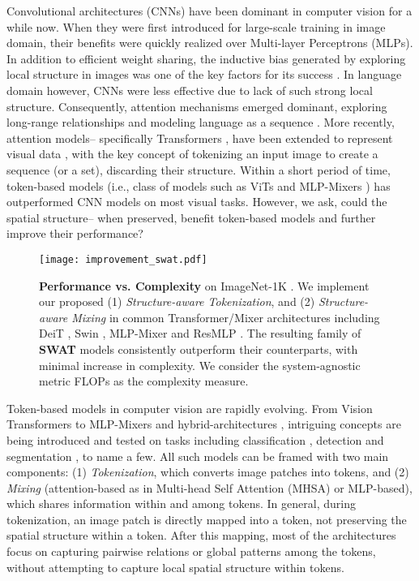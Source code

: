 \documentclass[10pt,twocolumn,letterpaper]{article}
\begin{document}
Convolutional architectures (CNNs) \cite{he2016deep, tan2019efficientnet} have been dominant in computer vision for a while now. When they were first introduced for large-scale training in image domain, their benefits were quickly realized over Multi-layer Perceptrons (MLPs). In addition to efficient weight sharing, the inductive bias generated by exploring local structure in images was one of the key factors for its success \cite{lecun2015deep}. In language domain however, CNNs were less effective due to lack of such strong local structure. Consequently, attention mechanisms emerged dominant, exploring long-range relationships and modeling language as a sequence \cite{dauphin2017language}. 
More recently, attention models-- specifically Transformers \cite{vaswani2017attention}, have been extended to represent visual data \cite{dosovitskiy2020image}, with the key concept of tokenizing an input image to create a sequence (or a set), discarding their structure. Within a short period of time, token-based models (i.e., class of models such as ViTs \cite{dosovitskiy2020image} and MLP-Mixers \cite{tolstikhin2021mixer}) has outperformed CNN models on most visual tasks. However, we ask, could the spatial structure-- when preserved, benefit token-based models and further improve their performance? 

\begin{figure}[t]
	\centering
	\texttt{[image: improvement\_swat.pdf]}
	\caption{\textbf{Performance vs. Complexity} on ImageNet-1K \cite{deng2009imagenet}. We implement our proposed  (1) \textit{Structure-aware Tokenization}, and (2) \textit{Structure-aware Mixing} in common Transformer/Mixer architectures including DeiT \cite{touvron2021deit}, Swin \cite{liu2021swin}, MLP-Mixer \cite{tolstikhin2021mixer} and ResMLP \cite{touvron2021resmlp}. The resulting family of \textbf{SWAT} models consistently outperform their counterparts, with minimal increase in complexity. We consider the system-agnostic metric FLOPs as the complexity measure.}
	\label{fig:acc_vs_compute}
\end{figure}

Token-based models in computer vision are rapidly evolving. From Vision Transformers \cite{dosovitskiy2020image} to MLP-Mixers \cite{tolstikhin2021mixer} and hybrid-architectures \cite{peng2021conformer, wu2021cvt}, intriguing concepts are being introduced and tested on tasks including classification \cite{dosovitskiy2020image, touvron2021deit, liu2021swin}, detection \cite{zhu2020deformable, carion2020end, dai2021up} and segmentation \cite{xie2021segformer, duke2021sstvos}, to name a few. All such models can be framed with two main components: (1) \textit{Tokenization}, which converts image patches into tokens, and (2) \textit{Mixing} (attention-based as in Multi-head Self Attention (MHSA) or MLP-based), which shares information within and among tokens. In general, during tokenization, an image patch is directly mapped into a token, not preserving the spatial structure within a token.
After this mapping, most of the architectures focus on capturing pairwise relations or global patterns among the tokens, without attempting to capture local spatial structure within tokens.
\end{document}
